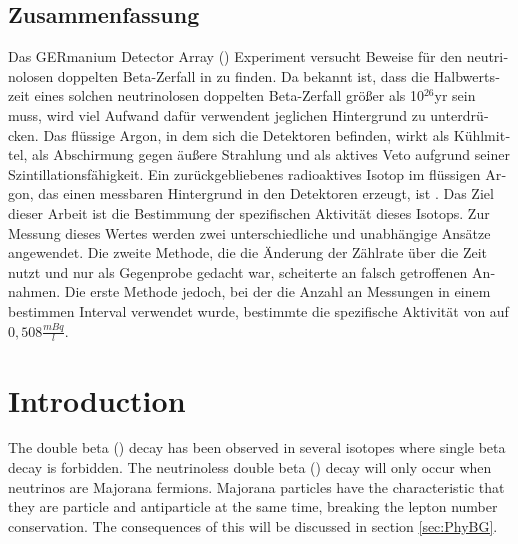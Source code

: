 \documentclass[encoding=utf8,british]{tumphthesis}
\begin{document}
\begin{otherlanguage}{ngerman}
\chapter*{Zusammenfassung}
Das GERmanium Detector Array (\gerda) Experiment versucht Beweise für den neutrinolosen doppelten Beta-Zerfall in  zu finden.
Da bekannt ist, dass die Halbwertszeit eines solchen neutrinolosen doppelten Beta-Zerfall größer als 10$^{26}$yr sein muss, wird viel Aufwand dafür verwendent jeglichen Hintergrund zu unterdrücken.
Das flüssige Argon, in dem sich die Detektoren befinden, wirkt als Kühlmittel, als Abschirmung gegen äußere Strahlung und als aktives Veto aufgrund seiner Szintillationsfähigkeit.
Ein zurückgebliebenes radioaktives Isotop im flüssigen Argon, das einen messbaren Hintergrund in den Detektoren erzeugt, ist .
Das Ziel dieser Arbeit ist die Bestimmung der spezifischen Aktivität dieses Isotops.
Zur Messung dieses Wertes werden zwei unterschiedliche und unabhängige Ansätze angewendet.
Die zweite Methode, die die Änderung der Zählrate über die Zeit nutzt und nur als Gegenprobe gedacht war, scheiterte an falsch getroffenen Annahmen.
Die erste Methode jedoch, bei der die Anzahl an Messungen in einem bestimmen Interval verwendet wurde, bestimmte die spezifische Aktivität von  auf $0,508\frac{mBq} {\unit{l}}$.
\end{otherlanguage}

\tableofcontents

\mainmatter

\chapter{Introduction}
\label{sec:intro}

The double beta (\twonu) decay has been observed in several isotopes where single beta decay is forbidden.
The neutrinoless double beta (\onbb) decay will only occur when neutrinos are Majorana fermions.
Majorana particles have the characteristic that they are particle and antiparticle at the same time, breaking the lepton number conservation.
The consequences of this will be discussed in  section \ref{sec:PhyBG}.
\\
\end{document}
